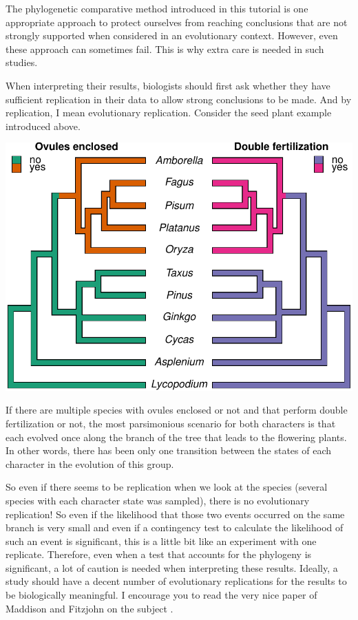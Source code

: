 \documentclass[
]{book}
\begin{document}
The phylogenetic comparative method introduced in this tutorial is one appropriate approach to protect ourselves from reaching conclusions that are not strongly supported when considered in an evolutionary context. However, even these approach can sometimes fail. This is why extra care is needed in such studies.

When interpreting their results, biologists should first ask whether they have sufficient replication in their data to allow strong conclusions to be made. And by replication, I mean evolutionary replication. Consider the seed plant example introduced above.

\begin{center}\includegraphics{pcm-workshop_files/figure-latex/AngiospermsWithCharacters4-1} \end{center}

If there are multiple species with ovules enclosed or not and that perform double fertilization or not, the most parsimonious scenario for both characters is that each evolved once along the branch of the tree that leads to the flowering plants. In other words, there has been only one transition between the states of each character in the evolution of this group.

So even if there seems to be replication when we look at the species (several species with each character state was sampled), there is no evolutionary replication! So even if the likelihood that those two events occurred on the same branch is very small and even if a contingency test to calculate the likelihood of such an event is significant, this is a little bit like an experiment with one replicate. Therefore, even when a test that accounts for the phylogeny is significant, a lot of caution is needed when interpreting these results. Ideally, a study should have a decent number of evolutionary replications for the results to be biologically meaningful. I encourage you to read the very nice paper of Maddison and Fitzjohn on the subject \citep{maddison2015unsolved}.
\end{document}
